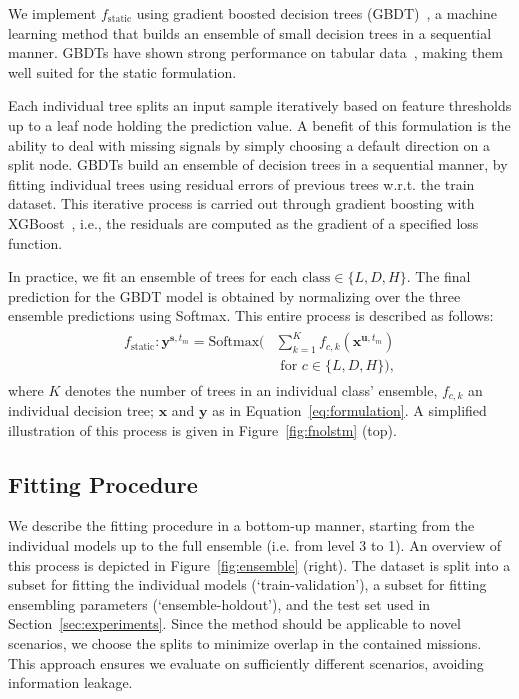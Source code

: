 We implement $f_{\text{static}}$ using gradient boosted decision trees (GBDT)~\cite{friedman2001greedy}, a machine learning method that builds an ensemble of small decision trees in a sequential manner. GBDTs have shown strong performance on tabular data~\cite{vadim2024,kit2023}, making them well suited for the static formulation.

Each individual tree splits an input sample iteratively based on feature thresholds up to a leaf node holding the prediction value. A benefit of this formulation is the ability to deal with missing signals by simply choosing a default direction on a split node. GBDTs build an ensemble of decision trees in a sequential manner, by fitting individual trees using residual errors of previous trees w.r.t. the train dataset. This iterative process is carried out through gradient boosting with XGBoost~\cite{xgboost2016}, i.e., the residuals are computed as the gradient of a specified loss function.

In practice, we fit an ensemble of trees for each {$\text{class} \in \{L, D, H\}$}. The final prediction for the GBDT model is obtained by normalizing over the three ensemble predictions using Softmax. This entire process is described as follows:
\begin{align}
\begin{split}
    f_{\text{static}}: \mathbf{y}^{\mathbf{s},t_m} = \text{Softmax}\big(&\sum_{k=1}^K f_{c,k} (\mathbf{x}^{\mathbf{u},t_m}) \\
    &{\text{ for } c \in \{L, D, H\}}\big),
\end{split}
\label{eq:fstatic_gbdt}
\end{align}
where $K$ denotes the number of trees in an individual class' ensemble, $f_{c,k}$ an individual decision tree; $\mathbf{x}$ and $\mathbf{y}$ as in Equation~\ref{eq:formulation}. A simplified illustration of this process is given in Figure~\ref{fig:fnolstm} (top).

\subsection{Fitting Procedure}
We describe the fitting procedure in a bottom-up manner, starting from the individual models up to the full ensemble (i.e. from level 3 to 1). An overview of this process is depicted in Figure~\ref{fig:ensemble} (right). The dataset is split into a subset for fitting the individual models (`train-validation'), a subset for fitting ensembling parameters (`ensemble-holdout'), and the test set used in Section~\ref{sec:experiments}. Since the method should be applicable to novel scenarios, we choose the splits to minimize overlap in the contained missions. This approach ensures we evaluate on sufficiently different scenarios, avoiding information leakage.

